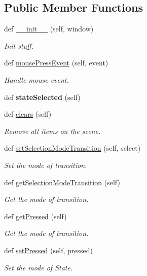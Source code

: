 \subsection*{Public Member Functions}
\begin{DoxyCompactItemize}
\item 
\mbox{\label{classScene_1_1Scene_a8a6ee6477f4cb004ddc666332db45035}} 
def \mbox{\hyperlink{classScene_1_1Scene_a8a6ee6477f4cb004ddc666332db45035}{\+\_\+\+\_\+init\+\_\+\+\_\+}} (self, window)
\begin{DoxyCompactList}\small\item\em Init stuff. \end{DoxyCompactList}\item 
def \mbox{\hyperlink{classScene_1_1Scene_ae53ab48d140cdcf3e66d62419cababc8}{mouse\+Press\+Event}} (self, event)
\begin{DoxyCompactList}\small\item\em Handle mouse event. \end{DoxyCompactList}\item 
\mbox{\label{classScene_1_1Scene_a644f55a49bb89aaaaf95df4ef552fab6}} 
def {\bfseries state\+Selected} (self)
\item 
\mbox{\label{classScene_1_1Scene_a7ee0db9b2de2650b5164ca4ff63aa2a3}} 
def \mbox{\hyperlink{classScene_1_1Scene_a7ee0db9b2de2650b5164ca4ff63aa2a3}{clears}} (self)
\begin{DoxyCompactList}\small\item\em Remove all items on the scene. \end{DoxyCompactList}\item 
def \mbox{\hyperlink{classScene_1_1Scene_ada613427a24da5cd438d1a72ed881b8a}{set\+Selection\+Mode\+Transition}} (self, select)
\begin{DoxyCompactList}\small\item\em Set the mode of transition. \end{DoxyCompactList}\item 
def \mbox{\hyperlink{classScene_1_1Scene_ad333ae8b06d17a6172cacc4606f13d9f}{get\+Selection\+Mode\+Transition}} (self)
\begin{DoxyCompactList}\small\item\em Get the mode of transition. \end{DoxyCompactList}\item 
def \mbox{\hyperlink{classScene_1_1Scene_a3f33b984679ec9f8c767f237df400026}{get\+Pressed}} (self)
\begin{DoxyCompactList}\small\item\em Get the mode of transition. \end{DoxyCompactList}\item 
def \mbox{\hyperlink{classScene_1_1Scene_a4441b549ee5f08e5f9bef1654798ec53}{set\+Pressed}} (self, pressed)
\begin{DoxyCompactList}\small\item\em Set the mode of State. \end{DoxyCompactList}\end{DoxyCompactItemize}
